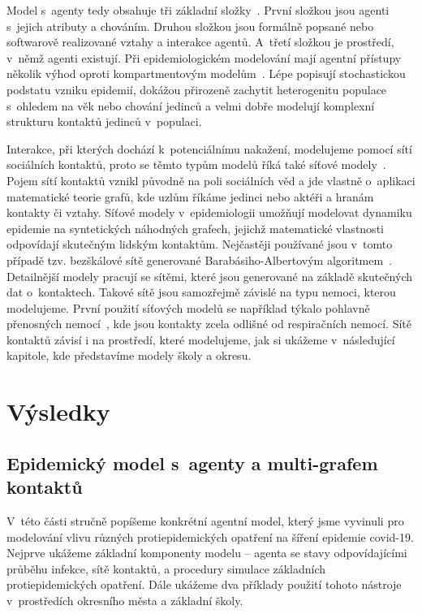 Model s~agenty tedy obsahuje tři základní složky~\cite{Macal14}. První složkou jsou agenti s~jejich atributy a chováním. Druhou složkou jsou formálně popsané nebo softwarově realizované vztahy a interakce agentů. A~třetí složkou je prostředí, v~němž agenti existují.   
Při epidemiologickém modelování mají agentní přístupy několik výhod oproti kompartmentovým modelům~\cite{Zino2021}. Lépe popisují stochastickou podstatu vzniku epidemií, dokážou přirozeně zachytit heterogenitu populace s~ohledem na věk nebo chování jedinců a velmi dobře modelují komplexní strukturu kontaktů jedinců v~populaci. 

Interakce, při kterých dochází k~potenciálnímu nakažení, modelujeme pomocí sítí sociálních kontaktů, proto se těmto typům modelů říká také síťové modely~\cite{Keeling2005}. Pojem sítí kontaktů vznikl původně na poli sociálních věd a jde vlastně o~aplikaci matematické teorie grafů, kde uzlům říkáme jedinci nebo aktéři a hranám kontakty či vztahy. Síťové modely v~epidemiologii umožňují modelovat dynamiku epidemie na syntetických náhodných grafech, jejichž matematické vlastnosti odpovídají skutečným lidským kontaktům. Nejčastěji používané jsou v~tomto případě tzv. bezškálové sítě generované Barabásiho-Albertovým algoritmem~\cite{Barabasi99}. Detailnější modely pracují se sítěmi, které jsou generované na základě skutečných dat o~kontaktech. Takové sítě jsou samozřejmě závislé na typu nemoci, kterou modelujeme. První použití síťových modelů se například týkalo pohlavně přenosných nemocí~\cite{Klovdahl85}, kde jsou kontakty zcela odlišné od respiračních nemocí. Sítě kontaktů závisí i na prostředí, které modelujeme, jak si ukážeme v~následující kapitole, kde představíme modely školy a okresu.


\section*{Výsledky} 

\subsection*{Epidemický model s~agenty a multi-grafem kontaktů}

V~této části stručně popíšeme konkrétní agentní model, který jsme vyvinuli pro modelování vlivu různých protiepidemických opatření na šíření epidemie covid-19. Nejprve ukážeme základní komponenty modelu -- agenta se stavy odpovídajícími průběhu infekce, sítě kontaktů, a procedury simulace základních protiepidemických opatření. Dále ukážeme dva příklady použití tohoto nástroje v~prostředích okresního města a základní školy.  

